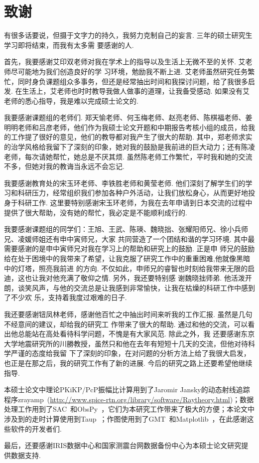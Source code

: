 \chapter*{致谢}

有很多话要说，但摄于文字力的持久，我努力克制自己的妄言. 三年的硕士研究生学习即将结束，而我有太多需
要感谢的人. 

首先，我要感谢艾印双老师对我在学术上的指导以及生活上无微不至的关怀. 艾老师尽可能地为我们创造良好的学
习环境，勉励我不断上进. 艾老师虽然研究任务繁忙，同时身负课题组众多事务，但还是经常抽出时间和我探讨问题，给了我很多启发. 在生活上，艾老师也时时教导我做人做事的道理，让我备受感动. 如果没有艾老师的悉心指导，我是难以完成硕士论文的. 

我要感谢课题组的老师们. 郑天愉老师、何玉梅老师、赵亮老师、陈棋福老师、姜明明老师和吕彦老师，他们作为我硕士论文开题和中期报告考核小组的成员，给我的工作提了很好的意见，他们的教导都对我产生了很大的帮助. 其中，郑老师求实的治学风格给我留下了深刻的印象，她对我的鼓励是我前进的巨大动力；还有陈凌老师，每次请她帮忙，她总是不厌其烦. 虽然陈老师工作繁忙，平时我和她的交流不多，但她对我的教诲当永远不会忘记. 

我要感谢教育处的宋玉环老师、李铁胜老师和黄莹老师. 他们深刻了解学生们的学习和科研压力，经常组织我们参加各种户外活动，让我们放松身心，从而更好地投身于科研工作. 这里要特别感谢宋玉环老师，为我在去年申请到日本交流的过程中提供了很大帮助，没有她的帮忙，我必定是不能顺利成行的. 

我要感谢课题组的同学们：王旭、王武、陈瑛、魏晓拙、张耀阳师兄、徐小兵师兄、凌媛师姐还有申中寅师兄，大家
共同营造了一个团结和谐的学习环境. 其中最需要感谢的是申中寅师兄对我在学习上的帮助和研究上的鼓励. 正是申
师兄的鼓励给在处于困境中的我带来了希望，让我克服了研究工作中的重重困难,他就像黑暗中的灯塔，照亮我前进
的方向. 不仅如此，申师兄的睿智也时刻给我带来无限的启迪，这也让我对他充满了敬仰之情. 另外，我还要特别感
谢魏晓拙师弟. 他活泼开朗，谈笑风声，与他的交流总是让我感到非常愉快，让我在枯燥的科研工作中感到了不少欢
乐，支持着我度过艰难的日子. 

我还要感谢钮凤林老师，感谢他百忙之中抽出时间来听我的工作汇报. 虽然是几句不经意间的建议，却给我的研究工
作带来了很大的帮助. 通过和他的交流，可以看出他总能站在高处看待科学问题，不愧是有大家风范. 除此之外，我
还要感谢东京大学地震研究所的川勝教授，虽然只和他在去年有短短十几天的交流，但他对待科学严谨的态度给我留
下了深刻的印象，在对问题的分析方法上给了我很大启发，也正是在那之后，我的研究工作有了新的进展. 今后的研究之路上还要希望他继续指导. 

本硕士论文中理论PKiKP/PcP振幅比计算用到了Jaromir Jansky的动态射线追踪程序zrayamp~(\url{http://www.spice-rtn.org/library/software/Raytheory.html})；数据处理工作用到了SAC~\citep{Goldstein2003a}和ObsPy~\citep{Beyreuther2010a}，它们为本研究工作带来了极大的方便；本论文中涉及到的走时计算使用到Taup~\citep{Crotwell1999a}；作图使用到了GMT~\citep{Wessel1991a}和Matplotlib~\citep{Hunter2007a}，在此感谢这些软件的开发者们. 

最后，还要感谢IRIS数据中心和国家测震台网数据备份中心为本硕士论文研究提供数据支持.